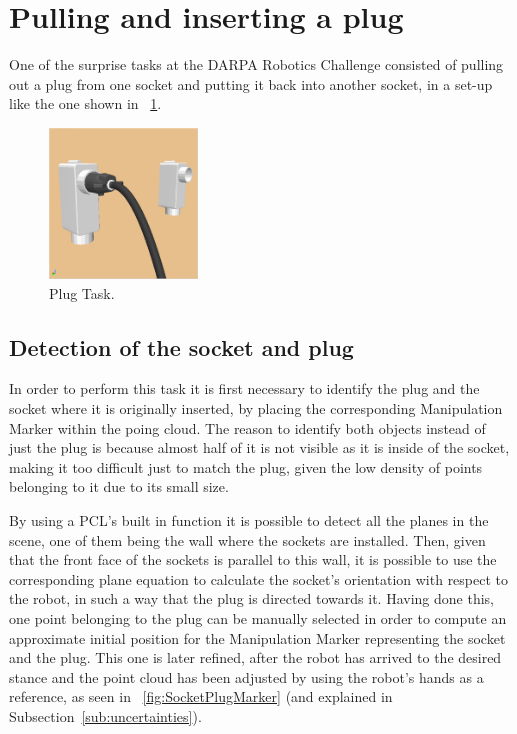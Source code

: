 \section{Pulling and inserting a plug}
	\label{sec:plug}
	
	One of the surprise tasks at the DARPA Robotics Challenge consisted of pulling out a plug
	from one socket and putting it back into another socket, in a set-up like the one shown in
	\figurename~\ref{fig:Sockets-Plug}.
	
	\begin{figure}[b]
		\centering
		\includegraphics[height = 4cm]{img/Sockets-Plug}
		\caption{Plug Task.}
		\label{fig:Sockets-Plug}
	\end{figure}
	
	\subsection{Detection of the socket and plug}
		
		In order to perform this task it is first necessary to identify the plug and the socket where
		it is originally inserted, by placing the corresponding Manipulation Marker within the poing cloud.
		The reason to identify both objects instead of just the plug is because almost half of it
		is not visible as it is inside of the socket, making it too difficult just to match the plug,
		given the low density of points belonging to it due to its small size.
		
		By using a PCL's built in function it is possible to detect all the planes in the scene,
		one of them being the wall where the sockets are installed.
		Then, given that the front face of the sockets is parallel to this wall, it is possible
		to use the corresponding plane equation to calculate the socket's orientation with respect to
		the robot, in such a way that the plug is directed towards it.
		Having done this, one point belonging to the plug can be manually selected in order to compute
		an approximate initial position for the Manipulation Marker representing the socket and the plug.
		This one is later refined, after the robot has arrived to the desired stance and the point cloud
		has been adjusted by using the robot's hands as a reference, as seen in
		\figurename~\ref{fig:SocketPlugMarker} (and explained in Subsection~\ref{sub:uncertainties}).
		
